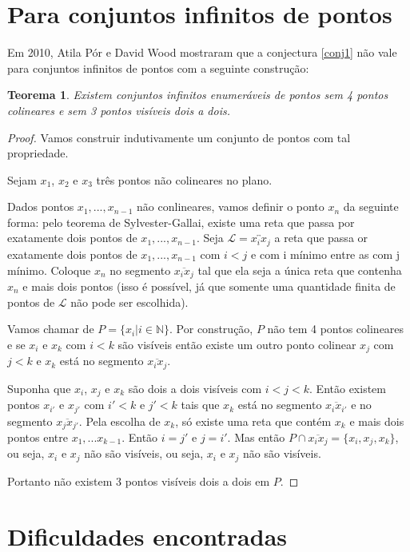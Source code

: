 \documentclass[a4paper]{book}
\newtheorem{teorema}{Teorema}
\begin{document}
\section{Para conjuntos infinitos de pontos}
Em 2010\cite{infinity}, Atila Pór e David Wood mostraram que a conjectura \ref{conj1} não vale para conjuntos infinitos de pontos com a seguinte construção:

\begin{teorema}
    Existem conjuntos infinitos enumeráveis de pontos sem 4 pontos colineares e sem 3 pontos visíveis dois a dois.
\end{teorema}
\begin{proof}
    Vamos construir indutivamente um conjunto de pontos com tal propriedade.

    Sejam $x_1$, $x_2$ e $x_3$ três pontos não colineares no plano.

    Dados pontos $x_1,...,x_{n-1}$ não conlineares, vamos definir o ponto $x_n$ da seguinte forma: pelo teorema de Sylvester-Gallai, existe uma reta que passa por exatamente dois pontos de $x_1,...,x_{n-1}$. Seja $\mathcal L=\overleftrightarrow{x_ix_j}$ a reta que passa or exatamente dois pontos de $x_1,...,x_{n-1}$ com $i<j$ e com i mínimo entre as com j mínimo. Coloque $x_n$ no segmento $\overline{x_ix_j}$ tal que ela seja a única reta que contenha $x_n$ e mais dois pontos (isso é possível, já que somente uma quantidade finita de pontos de $\mathcal L$ não pode ser escolhida).

    Vamos chamar de $P = \{x_i|i\in \mathbb N\}$. Por construção, $P$ não tem 4 pontos colineares e se $x_i$ e $x_k$ com $i<k$ são visíveis então existe um outro ponto colinear $x_j$ com $j<k$ e $x_k$ está no segmento $\overline{x_ix_j}$.

    Suponha que $x_i$, $x_j$ e $x_k$ são dois a dois visíveis com $i<j<k$. Então existem pontos $x_{i'}$ e $x_{j'}$ com $i'<k$ e $j'<k$ tais que $x_k$ está no segmento $\overline{x_ix_{i'}}$ e no segmento $\overline{x_jx_{j'}}$. Pela escolha de $x_k$, só existe uma reta que contém $x_k$ e mais dois pontos entre $x_1,...x_{k-1}$. Então $i=j'$ e $j=i'$. Mas então $P\cap\overline{x_ix_j}=\{x_i,x_j,x_k\}$, ou seja, $x_i$ e $x_j$ não são visíveis, ou seja, $x_i$ e $x_j$ não são visíveis.

    Portanto não existem 3 pontos visíveis dois a dois em $P$.

\end{proof}

\section{Dificuldades encontradas}
\end{document}
